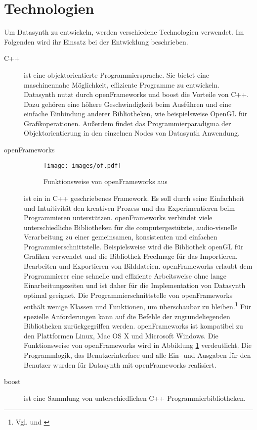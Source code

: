 \documentclass[a4paper, 
               12pt,
               DIV=calc,
               version=first,
               pdftex,
               headsepline,
               footsepline,
               bibliography=totocnumbered,
               listof=numbered]{scrreprt}
\begin{document}
\section{Technologien}
\label{sec:Technologien}
Um Datasynth zu entwickeln, werden verschiedene Technologien verwendet.
Im Folgenden wird ihr Einsatz bei der Entwicklung beschrieben.
\begin{description}
\item[C++]
ist eine objektorientierte Programmiersprache. Sie bietet
eine maschinennahe Möglichkeit, effiziente Programme zu entwickeln.
Datasynth nutzt durch openFrameworks und boost die Vorteile
von C++. Dazu gehören eine höhere Geschwindigkeit beim Ausführen
und eine einfache Einbindung anderer Bibliotheken, wie 
beispielsweise OpenGL für Grafikoperationen. Außerdem
findet das Programmierparadigma der Objektorientierung
in den einzelnen Nodes von Datasynth Anwendung.
\item[openFrameworks]
\begin{figure}
\centering
\texttt{[image: images/of.pdf]}
\caption{Funktionsweise von openFrameworks aus \citep{of_wiki}}
\label{fig:of}
\end{figure}
ist ein in C++ geschriebenes Framework. Es soll durch seine
Einfachheit und Intuitivität den kreativen Prozess und das
Experimentieren beim Programmieren unterstützen. openFrameworks
verbindet viele unterschiedliche Bibliotheken für die
computergestützte, audio-visuelle Verarbeitung zu einer gemeinsamen,
konsistenten und einfachen Programmierschnittstelle. Beispielsweise
wird die Bibliothek openGL für Grafiken verwendet und die
Bibliothek FreeImage für das Importieren, Bearbeiten und Exportieren von Bilddateien.
openFrameworks erlaubt dem Programmierer eine schnelle und effiziente Arbeitsweise ohne
lange Einarbeitungszeiten und ist daher für die Implementation von Datasynth optimal geeignet.
Die Programmierschnittstelle von openFrameworks enthält
wenige Klassen und Funktionen, um überschaubar zu bleiben.\footnote{Vgl. \citep{of1} und \citep{of2}}
Für spezielle Anforderungen kann auf die Befehle der zugrundeliegenden Bibliotheken
zurückgegriffen werden.
openFrameworks ist kompatibel zu den Plattformen
Linux, Mac OS X und Microsoft Windows.
Die Funktionsweise von openFrameworks wird in Abbildung
\ref{fig:of} verdeutlicht. 
Die Programmlogik, das Benutzerinterface und alle Ein- und
Ausgaben für den Benutzer wurden für Datasynth mit openFrameworks
realisiert.
\item[boost]
ist eine Sammlung von unterschiedlichen C++ Programmierbibliotheken.

\end{description}
\end{document}
